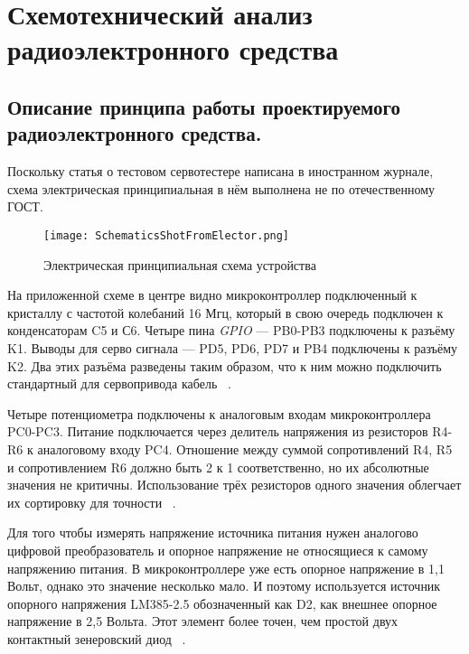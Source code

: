 \section{Схемотехнический анализ радиоэлектронного средства}


\subsection{Описание принципа работы
  проектируемого радиоэлектронного средства.}

Поскольку статья о тестовом сервотестере написана в иностранном
журнале, схема электрическая принципиальная в нём выполнена не по
отечественному ГОСТ.

\begin{figure}[H]
  \centering
  \texttt{[image: SchematicsShotFromElector.png]}
  \caption{Электрическая принципиальная схема устройства}
\end{figure}

На приложенной схеме в центре видно микроконтроллер подключенный к
кристаллу с частотой колебаний 16 Мгц, который в свою очередь
подключен к конденсаторам C5 и С6. Четыре пина \textit{GPIO} — PB0-PB3
подключены к разъёму K1. Выводы для серво сигнала — PD5, PD6, PD7 и
PB4 подключены к разъёму K2. Два этих разъёма разведены таким
образом, что к ним можно подключить стандартный для сервопривода
кабель ~\cite{Elector521}.

Четыре потенциометра подключены к аналоговым входам микроконтроллера
PC0-PC3. Питание подключается через делитель напряжения из резисторов
R4-R6 к аналоговому входу PC4. Отношение между суммой сопротивлений
R4, R5 и сопротивлением R6 должно быть 2 к 1 соответственно, но их
абсолютные значения не критичны. Использование трёх резисторов одного
значения облегчает их сортировку для точности ~\cite{Elector521}.

Для того чтобы измерять напряжение источника питания нужен аналогово
цифровой преобразователь и опорное напряжение не относящиеся к самому
напряжению питания.  В микроконтроллере уже есть опорное напряжение в
1,1 Вольт, однако это значение несколько мало. И поэтому используется
источник опорного напряжения LM385-2.5 обозначенный как D2, как
внешнее опорное напряжение в 2,5 Вольта. Этот элемент более точен, чем
простой двух контактный зенеровский диод ~\cite{Elector521}.


